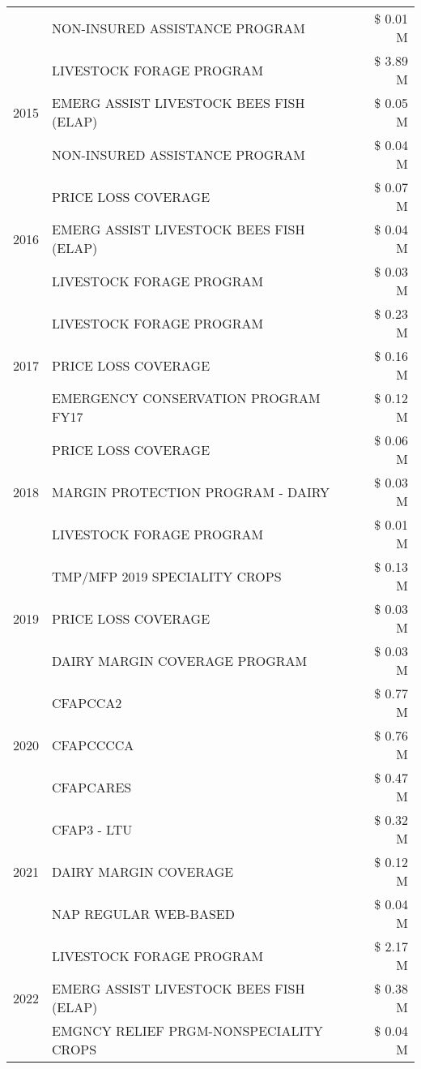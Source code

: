 \begin{tabular}{llr}
 & NON-INSURED ASSISTANCE PROGRAM & \$ 0.01 M \\
\cline{1-3}
\multirow[t]{3}{*}{2015} & LIVESTOCK FORAGE PROGRAM & \$ 3.89 M \\
 & EMERG ASSIST LIVESTOCK BEES FISH (ELAP) & \$ 0.05 M \\
 & NON-INSURED ASSISTANCE PROGRAM & \$ 0.04 M \\
\cline{1-3}
\multirow[t]{3}{*}{2016} & PRICE LOSS COVERAGE & \$ 0.07 M \\
 & EMERG ASSIST LIVESTOCK BEES FISH (ELAP) & \$ 0.04 M \\
 & LIVESTOCK FORAGE PROGRAM & \$ 0.03 M \\
\cline{1-3}
\multirow[t]{3}{*}{2017} & LIVESTOCK FORAGE PROGRAM & \$ 0.23 M \\
 & PRICE LOSS COVERAGE & \$ 0.16 M \\
 & EMERGENCY CONSERVATION PROGRAM FY17 & \$ 0.12 M \\
\cline{1-3}
\multirow[t]{3}{*}{2018} & PRICE LOSS COVERAGE & \$ 0.06 M \\
 & MARGIN PROTECTION PROGRAM - DAIRY & \$ 0.03 M \\
 & LIVESTOCK FORAGE PROGRAM & \$ 0.01 M \\
\cline{1-3}
\multirow[t]{3}{*}{2019} & TMP/MFP 2019 SPECIALITY CROPS & \$ 0.13 M \\
 & PRICE LOSS COVERAGE & \$ 0.03 M \\
 & DAIRY MARGIN COVERAGE PROGRAM & \$ 0.03 M \\
\cline{1-3}
\multirow[t]{3}{*}{2020} & CFAPCCA2 & \$ 0.77 M \\
 & CFAPCCCCA & \$ 0.76 M \\
 & CFAPCARES & \$ 0.47 M \\
\cline{1-3}
\multirow[t]{3}{*}{2021} & CFAP3 - LTU & \$ 0.32 M \\
 & DAIRY MARGIN COVERAGE & \$ 0.12 M \\
 & NAP REGULAR WEB-BASED & \$ 0.04 M \\
\cline{1-3}
\multirow[t]{3}{*}{2022} & LIVESTOCK FORAGE PROGRAM & \$ 2.17 M \\
 & EMERG ASSIST LIVESTOCK BEES FISH (ELAP) & \$ 0.38 M \\
 & EMGNCY RELIEF PRGM-NONSPECIALITY CROPS & \$ 0.04 M \\
\cline{1-3}
\bottomrule
\end{tabular}
